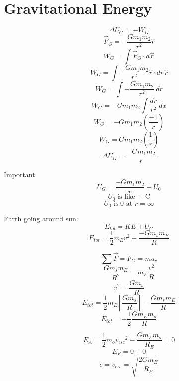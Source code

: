 \documentclass[fleqn]{article}
\begin{document}
\setlength{\mathindent}{0pt}
\section*{Gravitational Energy}
\[ \Delta U_G = -W_G \]
\[ \vec{F}_{G} = - \frac{Gm_1m_2}{r^2} \hat{r}   \]
\[ W_G = \int{\vec{F}_{G}  } \cdot d \vec{r}  \]
\[ W_G = \int{\frac{-Gm_1m_2}{r^2} \hat{r} } \cdot dr \, \hat{r} \]
\[ W_G = \int{- \frac{Gm_1m_2}{r^2} }\ dr \]
\[ W_G = -Gm_1m_2 \int{\frac{dr}{r^2} }\ dx \]
\[ W_G = -Gm_1m_2 \left( \frac{-1}{r}  \right) \]
\[ W_G = Gm_1m_2 \left( \frac{1}{r}  \right) \]
\[ \Delta U_G = \frac{-Gm_1m_2}{r}  \]

\underline{Important}
\[ U_G = \frac{-Gm_1m_2}{r} + U_0 \]
\[ U_0 \text{ is like + C}  \]
\[ U_0 \text{ is 0 at } r = \infty  \]

Earth going around sun:
\[ E_{tot} = KE + U_G \]
\[ E_{tot} = \frac{1}{2} m_Ev^2 + \frac{-Gm_sm_E}{R}  \]

\[ \sum \vec{F} = F_G = ma_c \]
\[ \frac{Gm_sm_E}{R^2} = m_E \frac{v^2}{R}  \]
\[ v^2 = \frac{Gm_s}{R}  \]
\[ E_{tot} = \frac{1}{2} m_E \left[ \frac{Gm_s}{R}  \right] - \frac{Gm_sm_E}{R}  \]
\[ E_{tot} = - \frac{1}{2} \frac{Gm_Em_s}{R}  \]

\[ E_A = \frac{1}{2} m_o {v _{esc} }^2 - \frac{Gm_Em_o}{R_E} = 0 \]
\[ E_B = 0 + 0 \]
\[ c = v _{esc} = \sqrt{\frac{2Gm_E}{R_E}}  \]
\end{document}
